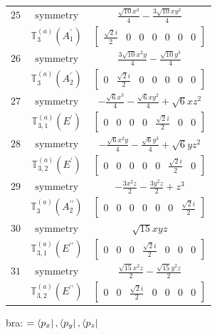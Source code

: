 \documentclass[fleqn,8pt,landscape]{jsarticle}
\begin{document}
\begin{longtable}{ccc}
$ 25 $ & $ \text{symmetry} $ & $ \frac{\sqrt{10} x^{3}}{4} - \frac{3 \sqrt{10} x y^{2}}{4} $ \\
$  $ & $ \mathbb{T}_{3}^{(a)}(A_{1}^{\prime}) $ & $ \begin{bmatrix} \frac{\sqrt{2} i}{2} & 0 & 0 & 0 & 0 & 0 & 0 \end{bmatrix} $ \\ \hline
$ 26 $ & $ \text{symmetry} $ & $ \frac{3 \sqrt{10} x^{2} y}{4} - \frac{\sqrt{10} y^{3}}{4} $ \\
$  $ & $ \mathbb{T}_{3}^{(a)}(A_{2}^{\prime}) $ & $ \begin{bmatrix} 0 & \frac{\sqrt{2} i}{2} & 0 & 0 & 0 & 0 & 0 \end{bmatrix} $ \\ \hline
$ 27 $ & $ \text{symmetry} $ & $ - \frac{\sqrt{6} x^{3}}{4} - \frac{\sqrt{6} x y^{2}}{4} + \sqrt{6} x z^{2} $ \\
$  $ & $ \mathbb{T}_{3,1}^{(a)}(E^{\prime}) $ & $ \begin{bmatrix} 0 & 0 & 0 & 0 & \frac{\sqrt{2} i}{2} & 0 & 0 \end{bmatrix} $ \\ \hline
$ 28 $ & $ \text{symmetry} $ & $ - \frac{\sqrt{6} x^{2} y}{4} - \frac{\sqrt{6} y^{3}}{4} + \sqrt{6} y z^{2} $ \\
$  $ & $ \mathbb{T}_{3,2}^{(a)}(E^{\prime}) $ & $ \begin{bmatrix} 0 & 0 & 0 & 0 & 0 & \frac{\sqrt{2} i}{2} & 0 \end{bmatrix} $ \\ \hline
$ 29 $ & $ \text{symmetry} $ & $ - \frac{3 x^{2} z}{2} - \frac{3 y^{2} z}{2} + z^{3} $ \\
$  $ & $ \mathbb{T}_{3}^{(a)}(A_{2}^{\prime\prime}) $ & $ \begin{bmatrix} 0 & 0 & 0 & 0 & 0 & 0 & \frac{\sqrt{2} i}{2} \end{bmatrix} $ \\ \hline
$ 30 $ & $ \text{symmetry} $ & $ \sqrt{15} x y z $ \\
$  $ & $ \mathbb{T}_{3,1}^{(a)}(E^{\prime\prime}) $ & $ \begin{bmatrix} 0 & 0 & 0 & \frac{\sqrt{2} i}{2} & 0 & 0 & 0 \end{bmatrix} $ \\ \hline
$ 31 $ & $ \text{symmetry} $ & $ \frac{\sqrt{15} x^{2} z}{2} - \frac{\sqrt{15} y^{2} z}{2} $ \\
$  $ & $ \mathbb{T}_{3,2}^{(a)}(E^{\prime\prime}) $ & $ \begin{bmatrix} 0 & 0 & \frac{\sqrt{2} i}{2} & 0 & 0 & 0 & 0 \end{bmatrix} $ \\ \hline
\end{longtable}
bra: $=\bra{p_{x}}, \bra{p_{y}}, \bra{p_{z}}$
\end{document}
